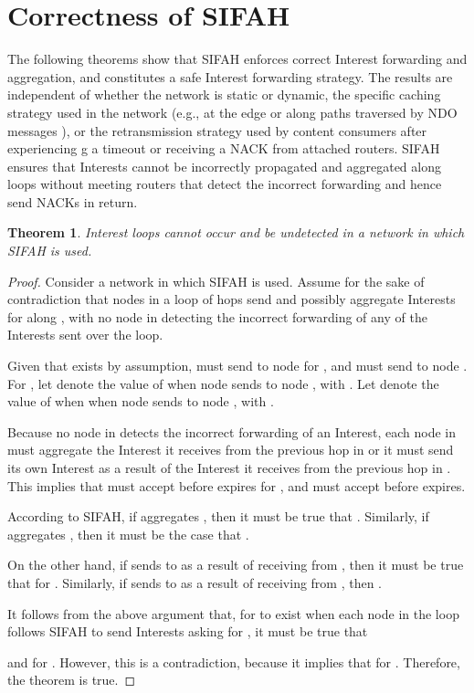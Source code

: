 \documentclass{ancs15-alternate}
\newtheorem{theorem}{Theorem}
\begin{document}
\section{Correctness of SIFAH}
\label{sec-correct}

The following theorems show that SIFAH enforces  correct Interest forwarding and aggregation, and constitutes a safe Interest forwarding strategy.
The results  are independent of whether the network is static or dynamic, the specific caching strategy used in the network (e.g., at the edge or along paths traversed by NDO messages \cite{caching}), or the retransmission strategy used by content consumers after experiencing g a timeout or receiving a NACK from attached routers. SIFAH ensures that Interests cannot be incorrectly propagated and aggregated along  loops without 
meeting routers that detect the incorrect forwarding and hence send  NACKs in return. 

\begin{theorem}
\label{theo3}
Interest loops cannot occur and be undetected in a network in which SIFAH is used.
\end{theorem}

\begin{proof}
Consider a network in which SIFAH is used.  Assume for the sake of contradiction that  nodes in a loop   of  hops      send and possibly aggregate
Interests for  along , with no node in   detecting the incorrect forwarding of any of the Interests sent over the loop.


Given that   exists by assumption,  must send  to node  for , and  must send  to node . 
For , let  denote the value of  when node 
   sends   to node ,  
with . 
Let  denote 
the value of  when when node  sends
 to node , with   . 

Because no node in  detects the incorrect forwarding  of an Interest, each node in  must aggregate the Interest it receives from the previous hop in  or it must send its own Interest as a result of the Interest it receives from the previous hop in . This implies that
 must accept  before  expires
for , and   must accept 
before  expires.

According to SIFAH, if  aggregates  , then it must be true that . 
Similarly, if  aggregates , then it must be the case that  . 

On the other hand, if  sends  to  as a result of receiving 
 from , then 
it must be true that   for .
Similarly, if
 sends  to  as a result of receiving 
 from  , then  .

It follows from the above argument that, for  to exist when each node in the loop follows SIFAH to send Interests asking for , it must be true that 

and
 for .
However, this is a contradiction, because it implies that  for .
Therefore, the theorem is true.\end{proof}
\end{document}
